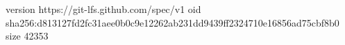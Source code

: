 version https://git-lfs.github.com/spec/v1
oid sha256:d813127fd2fc31aee0b0c9e12262ab231dd9439ff2324710e16856ad75cbf8b0
size 42353
